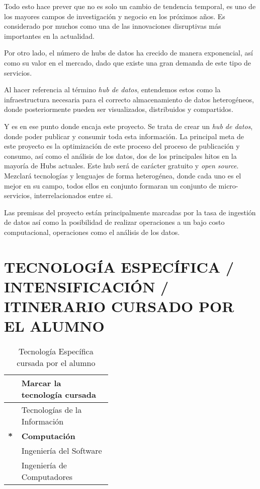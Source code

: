 \documentclass{pre-tfg}
\begin{document}
Todo esto hace prever que no es solo un cambio de tendencia temporal, es uno de los
mayores campos de investigación y negocio en los próximos años. Es considerado por muchos
como una de las innovaciones disruptivas más importantes en la actualidad.

Por otro lado, el número de hubs de datos ha crecido de manera exponencial, así como su
valor en el mercado, dado que existe una gran demanda de este tipo de servicios.

Al hacer referencia al término \emph{hub de datos}, entendemos estos como la infraestructura necesaria para el correcto almacenamiento de datos heterogéneos, donde posteriormente pueden ser visualizados, distribuidos y compartidos.

Y es en ese punto donde encaja este proyecto. Se trata de crear un \emph{hub de datos},
donde poder publicar y consumir toda esta información. La principal meta de este proyecto
es la optimización de este proceso del proceso de publicación y consumo, así como el
análisis de los datos, dos de los principales hitos en la mayoría de Hubs actuales. Este
hub será de carácter gratuito y \emph{open source}. Mezclará tecnologías y lenguajes de
forma heterogénea, donde cada uno es el mejor en su campo, todos ellos en conjunto
formaran un conjunto de micro-servicios, interrelacionados entre si.

Las premisas del proyecto están principalmente marcadas por la tasa de ingestión de datos
así como la posibilidad de realizar operaciones a un bajo costo computacional, operaciones
como el análisis de los datos.


\section{TECNOLOGÍA ESPECÍFICA / INTENSIFICACIÓN / ITINERARIO CURSADO POR EL ALUMNO}

\begin{table}[hp]
  \centering
  \caption{Tecnología Específica cursada por el alumno}
  \label{tab:tec-especifica}

  \begin{tabular}{p{0.01\linewidth}p{0.4\linewidth}}
    &\textbf{Marcar la tecnología cursada} \\
    \hline
    & Tecnologías de la Información \\
    \textbf{*} &\textbf{Computación} \\
    &Ingeniería del Software \\
    &Ingeniería de Computadores \\
    \hline
  \end{tabular}
\end{table}
\end{document}
